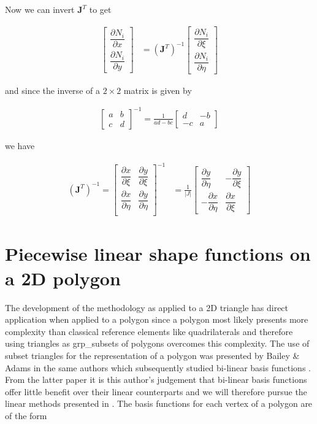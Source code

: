 \documentclass[11pt,letterpaper,titlepage]{article}
\newcommand{\beq}{\begin{equation*}
\begin{aligned}}
\newcommand{\eeq}{\end{aligned}
\end{equation*}}
\newcommand{\beqn}{\begin{equation}
	\begin{aligned}}
\newcommand{\eeqn}{\end{aligned}
	\end{equation}}
\newcommand{\stimes}{{\times}}
\begin{document}
Now we can invert $\mathbf{J}^T$ to get

\begingroup
\renewcommand*{\arraystretch}{1.5}
\beqn \label{eq:derivativeNtriangle}
\begin{bmatrix}
\dfrac{\partial N_i}{\partial x} \\
\dfrac{\partial N_i}{\partial y}
\end{bmatrix}
&=
(\mathbf{J}^T)^{-1}
\begin{bmatrix}
\dfrac{\partial N_i}{\partial \xi} \\
\dfrac{\partial N_i}{\partial \eta}
\end{bmatrix}
\eeqn 
\endgroup

and since the inverse of a $2\stimes 2$ matrix is given by

\beq 
\begin{bmatrix}
a & b\\
c & d
\end{bmatrix}^{-1}
=\frac{1}{ad-bc} 
\begin{bmatrix}
d & -b\\
-c & a
\end{bmatrix}
\eeq 

we have

\begingroup
\renewcommand*{\arraystretch}{1.5}
\beqn \label{eq:jacobianinversetriangle}
(\mathbf{J}^T)^{-1} =
\begin{bmatrix}
\dfrac{\partial x}{\partial \xi}   &\dfrac{\partial y}{\partial \xi} \\
\dfrac{\partial x}{\partial \eta}   &\dfrac{\partial y}{\partial \eta} \\
\end{bmatrix}^{-1}
&=
\frac{1}{|J|}
\begin{bmatrix}
\dfrac{\partial y}{\partial \eta}   & -\dfrac{\partial y}{\partial \xi} \\
-\dfrac{\partial x}{\partial \eta}  & \dfrac{\partial x}{\partial \xi} 
\end{bmatrix}
\eeqn
\endgroup





\newpage 
{}
\section{Piecewise linear shape functions on a 2D polygon}
The development of the methodology as applied to a 2D triangle has direct application when applied to a polygon since a polygon most likely presents more complexity than classical reference elements like quadrilaterals and therefore using triangles as grp_subsets of polygons overcomes this complexity. The use of subset triangles for the representation of a polygon was presented by Bailey \& Adams in \cite{BaileyAdamsPWLPolygons} the same authors which subsequently studied bi-linear basis functions \cite{BaileyAdamsPWBLPolygons}. From the latter paper it is this author's judgement that bi-linear basis functions offer little benefit over their linear counterparts and we will therefore pursue the linear methods presented in \cite{BaileyAdamsPWLPolygons}. The basis functions for each vertex of a polygon are of the form
\end{document}
